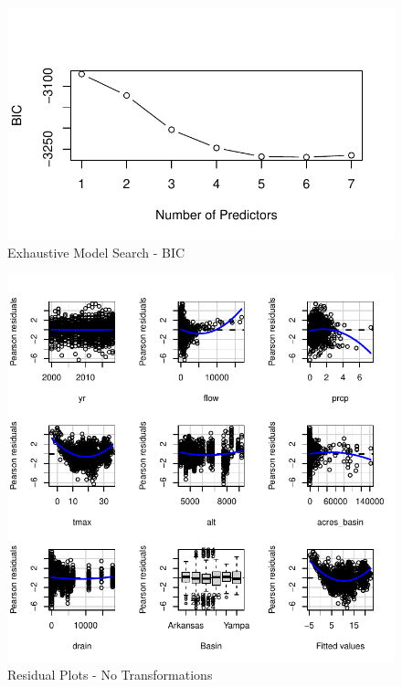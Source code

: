 \documentclass[
]{article}
\begin{document}
\begin{figure}
\centering
\includegraphics{D2P-Report_files/figure-latex/fig8-1.pdf}
\caption{\label{fig:figs8}Exhaustive Model Search - BIC}
\end{figure}

\begin{figure}
\centering
\includegraphics{D2P-Report_files/figure-latex/fig9-1.pdf}
\caption{\label{fig:figs9}Residual Plots - No Transformations}
\end{figure}
\end{document}
